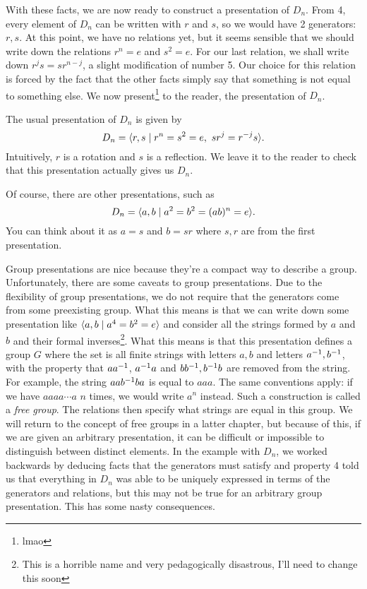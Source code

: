 \documentclass[./main.tex]{subfiles}
\begin{document}
With these facts, we are now ready to construct a presentation of $D_n$. From 4,
every element of $D_n$ can be written with $r$ and $s$, so we would have 2
generators: $r, s$. At this point, we have no relations yet, but it seems
sensible that we should write down the relations $r^n = e$ and $s^2 = e$. For
our last relation, we shall write down $r^j s = sr^{n-j}$, a slight modification
of number 5. Our choice for this relation is forced by the fact that the other
facts simply say that something is not equal to something else. We now
present\footnote{lmao} to the reader, the presentation of $D_n$.

\begin{example}[Presentation of $D_n$]
\label{example:presentation-of-dihedral}
    The usual presentation of $D_n$ is given by 
    \[
        D_n = { \langle r, s \mid r^n = s^2 = e, \,\, sr^j = r^{-j}s \rangle }.
    \]
    Intuitively, $r$ is a rotation and $s$ is a reflection. We leave it to the
    reader to check that this presentation actually gives us $D_n$. 

    Of course, there are other presentations, such as 
    \[
        D_n = { \langle a, b \mid a^2 = b^2 = (ab)^n = e \rangle }.
    \]
    You can think about it as $a=s$ and $b=sr$ where $s, r$ are from the first
    presentation.
\end{example}

Group presentations are nice because they're a compact way to describe a group.
Unfortunately, there are some caveats to group presentations. Due to the
flexibility of group presentations, we do not require that the generators come
from some preexisting group. What this means is that we can write down some
presentation like ${ \langle a, b \mid a^4 = b^2 = e \rangle }$ and consider all the strings
formed by $a$ and $b$ and their formal inverses\footnote{This is a horrible name
and very pedagogically disastrous, I'll need to change this soon}. What this
means is that this presentation defines a group $G$ where the set is all finite
strings with letters $a, b$ and letters $a^{-1}, b^{-1}$, with the property that
$aa^{-1}$, $a^{-1} a$ and $bb^{-1}, b^{-1} b$ are removed from the string. For
example, the string $aab^{-1} ba$ is equal to $aaa$. The same conventions apply:
if we have $aaaa \cdots a$ $n$ times, we would write $a^n$ instead. Such a
construction is called a \emph{free group}. The relations then specify what
strings are equal in this group. We will return to the concept of free groups in
a latter chapter, but because of this, if we are given an arbitrary
presentation, it can be difficult or impossible to distinguish between distinct
elements. In the example with $D_n$, we worked backwards by deducing facts that
the generators must satisfy and property 4 told us that everything in $D_n$ was
able to be uniquely expressed in terms of the generators and relations, but this
may not be true for an arbitrary group presentation. This has some nasty
consequences. 
\end{document}
